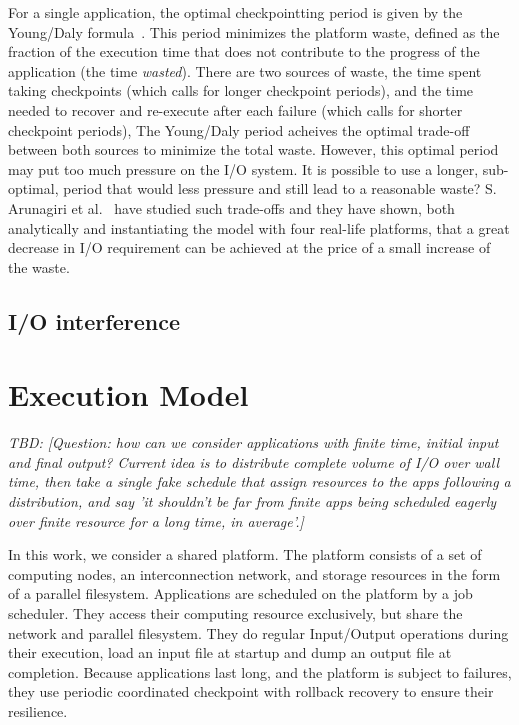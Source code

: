 \documentclass{article}
\newcommand{\todo}[1]{\textit{TBD: [#1]}}
\begin{document}
For a single application, the optimal checkpointting period is given by the Young/Daly
formula~\cite{young74,daly04}. This period minimizes the platform waste, defined as 
the fraction of the
execution time that does not contribute to the progress of the application (the
time \emph{wasted}).  There are two sources of waste, the time spent taking checkpoints
(which calls for longer checkpoint periods),
and the time needed to recover and re-execute after each failure
(which calls for shorter checkpoint periods),
The Young/Daly
period acheives the optimal trade-off between both sources to minimize the 
total waste.
However, this optimal period may put too much pressure 
on the I/O system. It is possible to use a longer, sub-optimal, period that would
less pressure and still lead to a reasonable waste? S. Arunagiri et al.~\cite{Arunagiri2009} have studied such trade-offs and they have shown, both analytically and instantiating the model with four real-life platforms,
that a great decrease in I/O requirement can be achieved  at the price of a small increase of the waste.



\subsection{I/O interference}


\section{Execution Model}
\label{sec.model}

\todo{Question: how can we consider applications with finite time, initial
  input and final output? Current idea is to distribute complete
  volume of I/O over wall time, then take a single fake schedule that
  assign resources to the apps following a distribution, and say 'it
  shouldn't be far from finite apps being scheduled eagerly over
  finite resource for a long time, in average'.}

In this work, we consider a shared platform. The platform consists of
a set of computing nodes, an interconnection network, and storage
resources in the form of a parallel filesystem. Applications are
scheduled on the platform by a job scheduler. They access their
computing resource exclusively, but share the network and parallel
filesystem. They do regular Input/Output operations during their
execution, load an input file at startup and dump an output file at
completion. Because applications last long, and the platform is
subject to failures, they use periodic coordinated checkpoint with
rollback recovery to ensure their resilience.
\end{document}
